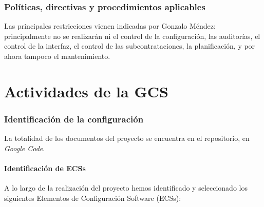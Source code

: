 \documentclass[spanish,a4paper,11pt, twoside]{report}	%
\begin{document}
	\section{Políticas, directivas y procedimientos aplicables}
	Las principales restricciones vienen indicadas por Gonzalo Méndez: principalmente no se realizarán ni el control de la configuración, las auditorías, el control de la interfaz, el control de las subcontrataciones, la planificación, y por ahora 
	tampoco el mantenimiento.


\setcounter{section}{0}

\part{Actividades de la GCS}
	\section{Identificación de la configuración}
		La totalidad de los documentos del proyecto se encuentra en el repositorio, en \textit{Google Code}. 

		\subsection{Identificación de ECSs}
			
			
			A lo largo de la realización del proyecto hemos identificado y seleccionado los siguientes Elementos de Configuración Software (ECSs):
			
\end{document}
